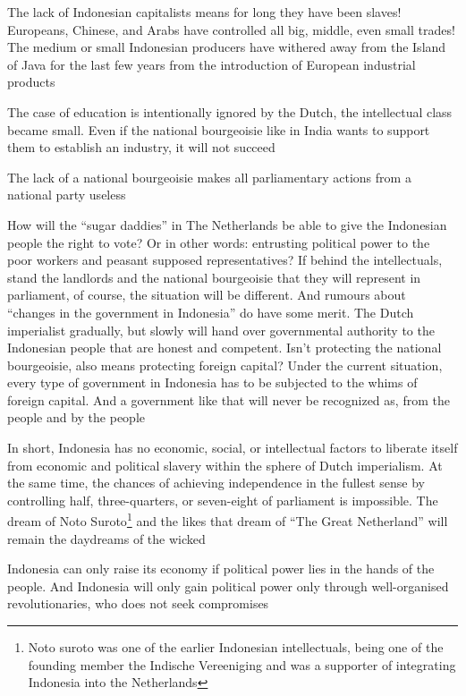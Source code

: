 The lack of Indonesian capitalists means for long they have been slaves! 
Europeans, Chinese, and Arabs have controlled all big, middle, even small trades! The medium 
or small Indonesian producers have withered away from the Island of Java for the last few 
years from the introduction of European industrial products\nline

The case of education is intentionally ignored by the Dutch, the intellectual class 
became small. Even if the national bourgeoisie like in India wants to support them 
to establish an industry, it will not succeed\nline

The lack of a national bourgeoisie makes all parliamentary actions from a national party useless\nline

How will the “sugar daddies” in The Netherlands be able 
to give the Indonesian people the right to vote? Or in other words: entrusting political 
power to the poor workers and peasant supposed representatives? If behind the intellectuals, 
stand the landlords and the national bourgeoisie that they will represent in parliament, 
of course, the situation will be different. And rumours about “changes in the government in Indonesia” 
do have some merit. The Dutch imperialist gradually, but slowly will hand over governmental authority 
to the Indonesian people that are honest and competent. Isn't protecting the national bourgeoisie, 
also means protecting foreign capital? Under the current situation, every type of government in 
Indonesia has to be subjected to the whims of foreign capital. And a government like that will never be recognized as, 
from the people and by the people\nline

In short, Indonesia has no economic, social, or intellectual factors to liberate itself 
from economic and political slavery within the sphere of Dutch imperialism. At the same 
time, the chances of achieving independence in the fullest sense by controlling half, 
three-quarters, or seven-eight of parliament is impossible. The dream of Noto Suroto\footnote[1]{Noto suroto was one of the earlier Indonesian intellectuals, being one of the founding member the Indische Vereeniging and was a supporter of integrating Indonesia into the Netherlands}
and the likes that dream of “The Great Netherland” will remain the daydreams of the wicked\nline

Indonesia can only raise its economy if political power lies in the hands of the people. 
And Indonesia will only gain political power only through well-organised revolutionaries, who does not seek compromises\nline

